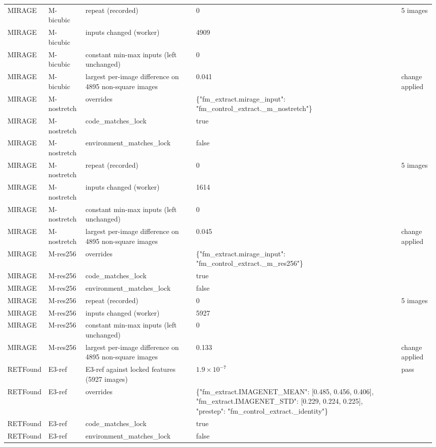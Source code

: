 \begin{longtable}{@{}llp{5.8cm}p{3.7cm}p{3.5cm}@{}}
MIRAGE & M-bicubic & repeat (recorded) & 0 & 5 images \\
MIRAGE & M-bicubic & inputs changed (worker) & 4909 &  \\
MIRAGE & M-bicubic & constant min-max inputs (left unchanged) & 0 &  \\
MIRAGE & M-bicubic & largest per-image difference on 4895 non-square images & 0.041 & change applied \\
MIRAGE & M-nostretch & overrides & \{"fm\_extract.mirage\_input": "fm\_control\_extract.\_m\_nostretch"\} &  \\
MIRAGE & M-nostretch & code\_matches\_lock & true &  \\
MIRAGE & M-nostretch & environment\_matches\_lock & false &  \\
MIRAGE & M-nostretch & repeat (recorded) & 0 & 5 images \\
MIRAGE & M-nostretch & inputs changed (worker) & 1614 &  \\
MIRAGE & M-nostretch & constant min-max inputs (left unchanged) & 0 &  \\
MIRAGE & M-nostretch & largest per-image difference on 4895 non-square images & 0.045 & change applied \\
MIRAGE & M-res256 & overrides & \{"fm\_extract.mirage\_input": "fm\_control\_extract.\_m\_res256"\} &  \\
MIRAGE & M-res256 & code\_matches\_lock & true &  \\
MIRAGE & M-res256 & environment\_matches\_lock & false &  \\
MIRAGE & M-res256 & repeat (recorded) & 0 & 5 images \\
MIRAGE & M-res256 & inputs changed (worker) & 5927 &  \\
MIRAGE & M-res256 & constant min-max inputs (left unchanged) & 0 &  \\
MIRAGE & M-res256 & largest per-image difference on 4895 non-square images & 0.133 & change applied \\
RETFound & E3-ref & E3-ref against locked features (5927 images) & $1.9\times10^{-7}$ & pass \\
RETFound & E3-ref & overrides & \{"fm\_extract.IMAGENET\_MEAN": [0.485, 0.456, 0.406], "fm\_extract.IMAGENET\_STD": [0.229, 0.224, 0.225], "prestep": "fm\_control\_extract.\_identity"\} &  \\
RETFound & E3-ref & code\_matches\_lock & true &  \\
RETFound & E3-ref & environment\_matches\_lock & false &  \\

\end{longtable}
